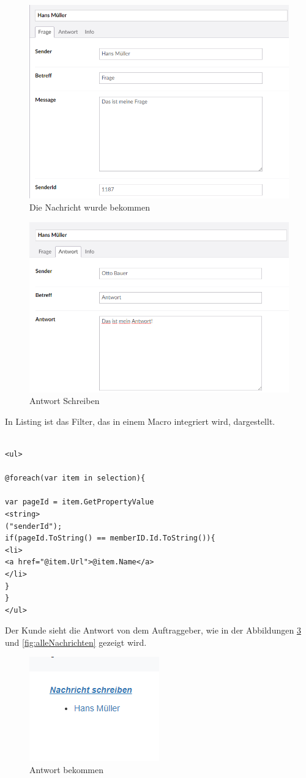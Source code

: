 \begin{figure}[h]
	\centering
	\includegraphics[width=0.7\linewidth]{Graphics/Message.png}
	\caption[Nachricht]{Die Nachricht wurde bekommen}
	\label{fig:Message}
\end{figure}

\begin{figure}[h]
	\centering
	\includegraphics[width=0.7\linewidth]{Graphics/antwortMassege.png}
	\caption[Nachricht]{Antwort Schreiben}
	\label{fig:antwort}
\end{figure}

\pagebreak

In Listing ist das Filter, das in einem Macro integriert wird, dargestellt.

\begin{lstlisting}[caption={NachrichFilter}, label=lst:NachrichFilter]

<ul>

@foreach(var item in selection){

var pageId = item.GetPropertyValue
<string>
("senderId");
if(pageId.ToString() == memberID.Id.ToString()){
<li>
<a href="@item.Url">@item.Name</a>
</li>
}
}
</ul>
\end{lstlisting}

Der Kunde sieht die Antwort von dem Auftraggeber, wie in der Abbildungen \ref{fig:bekommen} und \ref{fig:alleNachrichten} gezeigt wird.
\begin{figure}[h]
	\centering
	\includegraphics[width=0.3\linewidth]{Graphics/nachrichtBekomm.png}
	\caption[Nachricht]{Antwort bekommen}
	\label{fig:bekommen}
\end{figure}

